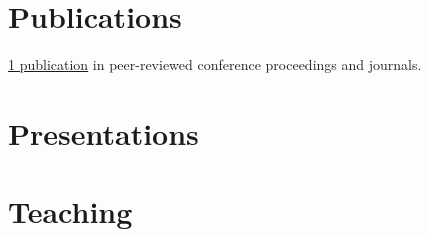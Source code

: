 \documentclass[a4paper,extended]{adcv}
\begin{document}
    \section{Publications}

    \ifextended

        \begin{refsection}
            \nocite{Benshila_Etal_2020}
            \printbibliography[title={Peer-reviewed journals},heading=subbibliography]
        \end{refsection}



    \else
        \href{https://scholar.google.com/citations?user=tqxQbU0AAAAJ}{1 publication} in peer-reviewed conference proceedings and journals.
    \fi

    \ifextended
        \section{Presentations}

        \begin{adcvpresentations}
        \end{adcvpresentations}
    \fi

    \ifextended
        \section{Teaching}
\end{document}

